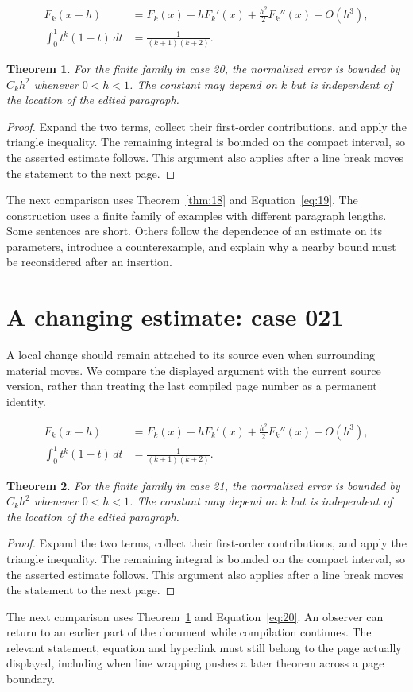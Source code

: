\documentclass[a4paper,10pt]{article}
\newtheorem{theorem}{Theorem}[section]
\begin{document}
\lipsum[28-29]
\begin{align}\label{eq:19}
 F_k(x+h)&=F_k(x)+hF_k'(x)+\frac{h^2}{2}F_k''(x)+O(h^3),\\
 \int_0^1 t^k(1-t)\,dt&=\frac{1}{(k+1)(k+2)}.
\end{align}
\begin{theorem}\label{thm:19}
For the finite family in case 20, the normalized error is bounded by $C_k h^2$ whenever $0<h<1$. The constant may depend on $k$ but is independent of the location of the edited paragraph.
\end{theorem}
\begin{proof}
Expand the two terms, collect their first-order contributions, and apply the
triangle inequality. The remaining integral is bounded on the compact interval,
so the asserted estimate follows. This argument also applies after a line break
moves the statement to the next page.
\end{proof}
The next comparison uses Theorem~\ref{thm:18} and Equation~\ref{eq:19}. The construction uses a finite family of examples with different paragraph lengths. Some sentences are short. Others follow the dependence of an estimate on its parameters, introduce a counterexample, and explain why a nearby bound must be reconsidered after an insertion.

\lipsum[23]

\section{A changing estimate: case 021}\label{unit:20}
A local change should remain attached to its source even when surrounding material moves. We compare the displayed argument with the current source version, rather than treating the last compiled page number as a permanent identity.

\lipsum[1-2]
\begin{align}\label{eq:20}
 F_k(x+h)&=F_k(x)+hF_k'(x)+\frac{h^2}{2}F_k''(x)+O(h^3),\\
 \int_0^1 t^k(1-t)\,dt&=\frac{1}{(k+1)(k+2)}.
\end{align}
\begin{theorem}\label{thm:20}
For the finite family in case 21, the normalized error is bounded by $C_k h^2$ whenever $0<h<1$. The constant may depend on $k$ but is independent of the location of the edited paragraph.
\end{theorem}
\begin{proof}
Expand the two terms, collect their first-order contributions, and apply the
triangle inequality. The remaining integral is bounded on the compact interval,
so the asserted estimate follows. This argument also applies after a line break
moves the statement to the next page.
\end{proof}
The next comparison uses Theorem~\ref{thm:19} and Equation~\ref{eq:20}. An observer can return to an earlier part of the document while compilation continues. The relevant statement, equation and hyperlink must still belong to the page actually displayed, including when line wrapping pushes a later theorem across a page boundary.
\end{document}
